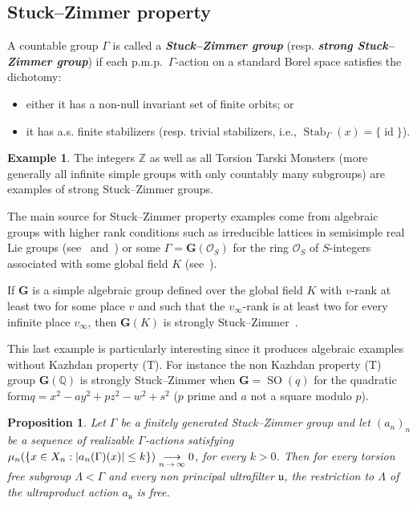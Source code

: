 \documentclass[10pt]{amsart}
\newtheorem{prop}[cdrthm]{Proposition}
\theoremstyle{definition}
\newtheorem{exam}[cdrthm]{Example}
\newcommand{\defin}[1]{\textbf{\emph{#1}}}
\newcommand{\Zmath}{\mathbb{Z}}
\newcommand{\Qmath}{\mathbb{Q}}
\newcommand{\cO}{\mathcal{O}}
\newcommand{\bfG}{\mathbf{G}}
\DeclareMathOperator{\Stab}{Stab}
\DeclareMathOperator{\id}{id}
\DeclareMathOperator{\SO}{SO}
\newcommand{\ul}{\mathfrak{u}}
\newcommand{\pmp}{p.m.p.\ }
\begin{document}
\subsection{Stuck--Zimmer property}


A countable group $\Gamma$ is called a
\defin{Stuck--Zimmer group} (resp.
\defin{strong Stuck--Zimmer group}) if each \pmp $\Gamma$-action on a standard Borel space satisfies the dichotomy:
\begin{itemize}
\item[--] either it has a non-null invariant set of finite orbits; or
\item[--] it has a.s. finite stabilizers (resp. trivial stabilizers, i.e., $\Stab_{\Gamma}(x)=\{\id\}$).
\end{itemize}
\begin{exam}

The integers $\Zmath$ as well as all Torsion Tarski Monsters (more generally all infinite simple groups with only countably many subgroups) are examples of strong Stuck--Zimmer groups.

The main source for Stuck--Zimmer property examples come from algebraic groups with higher rank conditions such as irreducible lattices in semisimple real Lie groups (see~\cite{Stuck-Zimmer-1994} and~\cite{Creutz-Peterson-2017}) or some $\Gamma=\bfG(\cO_S)$ for the ring $\cO_S$ of $S$-integers associated with some global field $K$ (see~\cite[Theorem~10.8]{Creutz-Peterson-2017}).

If $\bfG$ is a simple algebraic group defined over the global field $K$ with $v$-rank at least two for some place $v$ and such that the $v_{\infty}$-rank is at least two for every infinite place $v_{\infty}$, then $\bfG(K)$ is strongly Stuck--Zimmer~\cite[Corollary~10.9]{Creutz-Peterson-2017}.

This last example is particularly interesting since it produces algebraic examples without Kazhdan property (T). For instance the non Kazhdan property (T) group $\bfG(\Qmath)$ is strongly Stuck--Zimmer when $\bfG=\SO(q)$ for the quadratic form\linebreak$q=x^2 - a y^2 + pz^2 - w^2 + s^2$ ($p$ prime and $a$ not a square modulo $p$).
\end{exam}

\begin{prop}\label{prop: Stuck-Zimmer gps and u-limits}
Let $\Gamma$ be a finitely generated Stuck--Zimmer group and let $(a_n)_n$ be a sequence of realizable $\Gamma$-actions satisfying $\mu_{n}(\{x\in X_n: \vert a_n(\Gamma) (x) \vert \linebreak\leq k\})\underset{n\,\to\,\infty}{\longrightarrow} 0$, for every $k>0$. Then for every torsion free subgroup $\Lambda<\Gamma$ and every non principal ultrafilter $\ul$, the restriction to $\Lambda$ of the ultraproduct action $a_{\ul}$ is free.
\end{prop}
\end{document}
